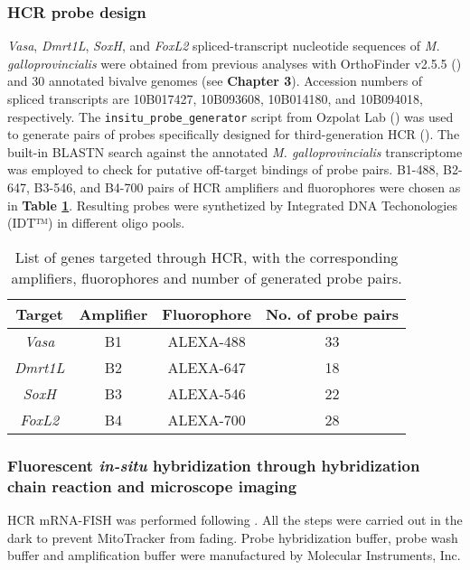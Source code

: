 \documentclass[../main.tex]{subfiles}
\begin{document}
\subsubsection{HCR probe design} \label{probedesign_MM}
\textit{Vasa}, \textit{Dmrt1L}, \textit{SoxH}, and \textit{FoxL2} spliced-transcript nucleotide sequences of \textit{M. galloprovincialis} were obtained from previous analyses with OrthoFinder v2.5.5 (\textbf{\cite{emms2019orthofinder}}) and 30 annotated bivalve genomes (see \textbf{Chapter 3}). Accession numbers of spliced transcripts are 10B017427, 10B093608, 10B014180, and 10B094018, respectively. The \verb|insitu_probe_generator| script from Ozpolat Lab (\textbf{\cite{kuehn2022probegenerator}}) was used to generate pairs of probes specifically designed for third-generation HCR (\textbf{\cite{choi2018hcr3}}). The built-in BLASTN search against the annotated \textit{M. galloprovincialis} transcriptome was employed to check for putative off-target bindings of probe pairs. B1-488, B2-647, B3-546, and B4-700 pairs of HCR amplifiers and fluorophores were chosen as in \textbf{Table \ref{tab:probes}}. Resulting probes were synthetized by Integrated DNA Techonologies (IDT™) in different oligo pools.

\begin{table}
    \centering
    \begin{tabular}{c c c c}
         \hline
         \textbf{Target} & \textbf{Amplifier} & \textbf{Fluorophore} & \textbf{No. of probe pairs} \\
         \hline
         \textit{Vasa} & B1 & ALEXA-488 & 33 \\
         \textit{Dmrt1L} & B2 & ALEXA-647 & 18 \\
         \textit{SoxH} & B3 & ALEXA-546 & 22 \\
         \textit{FoxL2} & B4 & ALEXA-700 & 28 \\
         \hline
    \end{tabular}
    \caption{List of genes targeted through HCR, with the corresponding amplifiers, fluorophores and number of generated probe pairs.}
    \label{tab:probes}
\end{table}

\subsubsection{Fluorescent \textit{in-situ} hybridization through hybridization chain reaction and microscope imaging} \label{hcrprotocol_MM}
HCR mRNA-FISH was performed following \textbf{\cite{miglioli2024hcrMytilus}}. All the steps were carried out in the dark to prevent MitoTracker from fading. Probe hybridization buffer, probe wash buffer and amplification buffer were manufactured by Molecular Instruments, Inc.
\end{document}
